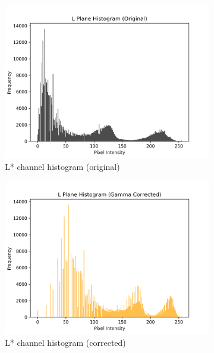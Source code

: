 \documentclass[10pt,a4paper]{article}
\begin{document}
\begin{figure}[htbp] %
  \centering
  \begin{subfigure}[t]{.24\linewidth}\centering
    \includegraphics[width=\linewidth]{task3/L_plane_histogram_original.png}
    \caption{L* channel histogram (original)}
  \end{subfigure}\hfill
  \begin{subfigure}[t]{.24\linewidth}\centering
    \includegraphics[width=\linewidth]{task3/L_plane_histogram_corrected.png}
    \caption{L* channel histogram (corrected)}
  \end{subfigure}\hfill
  \begin{subfigure}[t]{.24\linewidth}\centering

\end{subfigure}
\end{figure}
\end{document}
